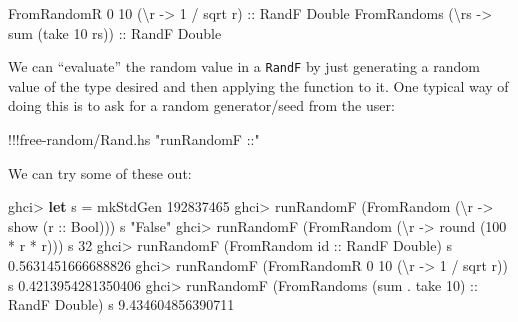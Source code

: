 \documentclass[]{article}
\newenvironment{Shaded}{}{}
\newcommand{\KeywordTok}[1]{\textcolor[rgb]{0.00,0.44,0.13}{\textbf{{#1}}}}
\newcommand{\DataTypeTok}[1]{\textcolor[rgb]{0.56,0.13,0.00}{{#1}}}
\newcommand{\DecValTok}[1]{\textcolor[rgb]{0.25,0.63,0.44}{{#1}}}
\newcommand{\FloatTok}[1]{\textcolor[rgb]{0.25,0.63,0.44}{{#1}}}
\newcommand{\StringTok}[1]{\textcolor[rgb]{0.25,0.44,0.63}{{#1}}}
\newcommand{\OtherTok}[1]{\textcolor[rgb]{0.00,0.44,0.13}{{#1}}}
\newcommand{\FunctionTok}[1]{\textcolor[rgb]{0.02,0.16,0.49}{{#1}}}
\newcommand{\NormalTok}[1]{{#1}}
\begin{document}
\begin{Shaded}
\begin{Highlighting}[]
\DataTypeTok{FromRandomR} \DecValTok{0} \DecValTok{10} \NormalTok{(\textbackslash{}r }\OtherTok{->} \DecValTok{1} \FunctionTok{/} \NormalTok{sqrt r)}\OtherTok{ ::} \DataTypeTok{RandF} \DataTypeTok{Double}
\DataTypeTok{FromRandoms} \NormalTok{(\textbackslash{}rs }\OtherTok{->} \NormalTok{sum (take }\DecValTok{10} \NormalTok{rs))}\OtherTok{ ::} \DataTypeTok{RandF} \DataTypeTok{Double}
\end{Highlighting}
\end{Shaded}

We can ``evaluate'' the random value in a \texttt{RandF} by just
generating a random value of the type desired and then applying the
function to it. One typical way of doing this is to ask for a random
generator/seed from the user:

\begin{Shaded}
\begin{Highlighting}[]
\FunctionTok{!!!}\NormalTok{free}\FunctionTok{-}\NormalTok{random}\FunctionTok{/}\NormalTok{Rand.hs }\StringTok{"runRandomF ::"}
\end{Highlighting}
\end{Shaded}

We can try some of these out:

\begin{Shaded}
\begin{Highlighting}[]
\NormalTok{ghci}\FunctionTok{>} \KeywordTok{let} \NormalTok{s }\FunctionTok{=} \NormalTok{mkStdGen }\DecValTok{192837465}
\NormalTok{ghci}\FunctionTok{>} \NormalTok{runRandomF (}\DataTypeTok{FromRandom} \NormalTok{(\textbackslash{}r }\OtherTok{->} \NormalTok{show (}\OtherTok{r ::} \DataTypeTok{Bool}\NormalTok{))) s}
\StringTok{"False"}
\NormalTok{ghci}\FunctionTok{>} \NormalTok{runRandomF (}\DataTypeTok{FromRandom} \NormalTok{(\textbackslash{}r }\OtherTok{->} \NormalTok{round (}\DecValTok{100} \FunctionTok{*} \NormalTok{r }\FunctionTok{*} \NormalTok{r))) s}
\DecValTok{32}
\NormalTok{ghci}\FunctionTok{>} \NormalTok{runRandomF (}\DataTypeTok{FromRandom}\OtherTok{ id ::} \DataTypeTok{RandF} \DataTypeTok{Double}\NormalTok{) s}
\FloatTok{0.5631451666688826}
\NormalTok{ghci}\FunctionTok{>} \NormalTok{runRandomF (}\DataTypeTok{FromRandomR} \DecValTok{0} \DecValTok{10} \NormalTok{(\textbackslash{}r }\OtherTok{->} \DecValTok{1} \FunctionTok{/} \NormalTok{sqrt r)) s}
\FloatTok{0.4213954281350406}
\NormalTok{ghci}\FunctionTok{>} \NormalTok{runRandomF (}\DataTypeTok{FromRandoms} \NormalTok{(sum }\FunctionTok{.} \NormalTok{take }\DecValTok{10}\NormalTok{)}\OtherTok{ ::} \DataTypeTok{RandF} \DataTypeTok{Double}\NormalTok{) s}
\FloatTok{9.434604856390711}
\end{Highlighting}
\end{Shaded}
\end{document}
